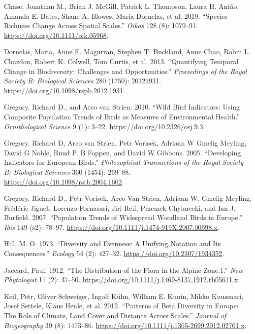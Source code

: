 \documentclass[
  12pt,
  oneside]{report}
\begin{document}
\leavevmode\hypertarget{ref-chase_species_2019}{}%
Chase, Jonathan M., Brian J. McGill, Patrick L. Thompson, Laura H. Antão, Amanda E. Bates, Shane A. Blowes, Maria Dornelas, et al. 2019. ``Species Richness Change Across Spatial Scales.'' \emph{Oikos} 128 (8): 1079--91. \url{https://doi.org/10.1111/oik.05968}.

\leavevmode\hypertarget{ref-dornelas_quantifying_2013}{}%
Dornelas, Maria, Anne E. Magurran, Stephen T. Buckland, Anne Chao, Robin L. Chazdon, Robert K. Colwell, Tom Curtis, et al. 2013. ``Quantifying Temporal Change in Biodiversity: Challenges and Opportunities.'' \emph{Proceedings of the Royal Society B: Biological Sciences} 280 (1750): 20121931. \url{https://doi.org/10.1098/rspb.2012.1931}.

\leavevmode\hypertarget{ref-gregory_wild_2010}{}%
Gregory, Richard D., and Arco van Strien. 2010. ``Wild Bird Indicators: Using Composite Population Trends of Birds as Measures of Environmental Health.'' \emph{Ornithological Science} 9 (1): 3--22. \url{https://doi.org/10.2326/osj.9.3}.

\leavevmode\hypertarget{ref-gregory_developing_2005}{}%
Gregory, Richard D, Arco van Strien, Petr Vorisek, Adriaan W Gmelig Meyling, David G Noble, Ruud P. B Foppen, and David W Gibbons. 2005. ``Developing Indicators for European Birds.'' \emph{Philosophical Transactions of the Royal Society B: Biological Sciences} 360 (1454): 269--88. \url{https://doi.org/10.1098/rstb.2004.1602}.

\leavevmode\hypertarget{ref-gregory_population_2007}{}%
Gregory, Richard D., Petr Vorisek, Arco Van Strien, Adriaan W. Gmelig Meyling, Frédéric Jiguet, Lorenzo Fornasari, Jiri Reif, Przemek Chylarecki, and Ian J. Burfield. 2007. ``Population Trends of Widespread Woodland Birds in Europe.'' \emph{Ibis} 149 (s2): 78--97. \url{https://doi.org/10.1111/j.1474-919X.2007.00698.x}.

\leavevmode\hypertarget{ref-hill_diversity_1973}{}%
Hill, M. O. 1973. ``Diversity and Evenness: A Unifying Notation and Its Consequences.'' \emph{Ecology} 54 (2): 427--32. \url{https://doi.org/10.2307/1934352}.

\leavevmode\hypertarget{ref-jaccard_distribution_1912}{}%
Jaccard, Paul. 1912. ``The Distribution of the Flora in the Alpine Zone.1.'' \emph{New Phytologist} 11 (2): 37--50. \url{https://doi.org/10.1111/j.1469-8137.1912.tb05611.x}.

\leavevmode\hypertarget{ref-keil_patterns_2012}{}%
Keil, Petr, Oliver Schweiger, Ingolf Kühn, William E. Kunin, Mikko Kuussaari, Josef Settele, Klaus Henle, et al. 2012. ``Patterns of Beta Diversity in Europe: The Role of Climate, Land Cover and Distance Across Scales.'' \emph{Journal of Biogeography} 39 (8): 1473--86. \url{https://doi.org/10.1111/j.1365-2699.2012.02701.x}.
\end{document}
